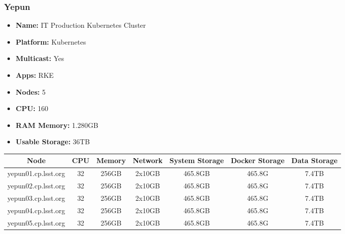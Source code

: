 \newpage
\subsubsection{Yepun}
\begin{itemize}
  \itemsep0em 
  \item \textbf{Name:}       IT Production Kubernetes Cluster
  \item \textbf{Platform:}   Kubernetes
  \item \textbf{Multicast:}  Yes
  \item \textbf{Apps:}       RKE
  \item \textbf{Nodes:}      5
  \item \textbf{CPU:}        160
  \item \textbf{RAM Memory:} 1.280GB 
  \item \textbf{Usable Storage:} 36TB
\end{itemize}
\begin{center}
  \small
  \begin{tabular}{||c c c c c c c||} 
    \hline
    \textbf{Node} & \textbf{CPU} & \textbf{Memory} & \textbf{Network} & \textbf{System Storage} & \textbf{Docker Storage} & \textbf{Data Storage} \\ [0.5ex]
    \hline
    yepun01.cp.lsst.org & 32 & 256GB & 2x10GB & 465.8GB & 465.8G & 7.4TB \\
    \hline
    yepun02.cp.lsst.org & 32 & 256GB & 2x10GB & 465.8GB & 465.8G & 7.4TB \\
    \hline
    yepun03.cp.lsst.org & 32 & 256GB & 2x10GB & 465.8GB & 465.8G & 7.4TB \\
    \hline
    yepun04.cp.lsst.org & 32 & 256GB & 2x10GB & 465.8GB & 465.8G & 7.4TB \\
    \hline
    yepun05.cp.lsst.org & 32 & 256GB & 2x10GB & 465.8GB & 465.8G & 7.4TB \\
    \hline    
  \end{tabular}
\end{center}

\newpage
